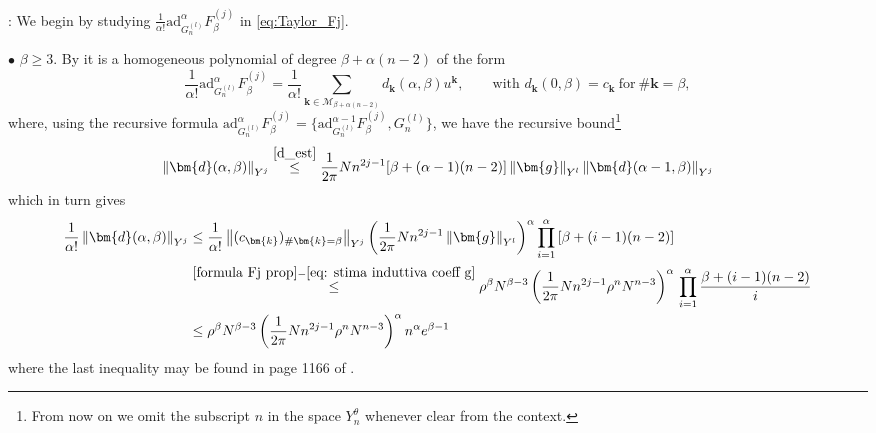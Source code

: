 \documentclass[a4paper,10pt,reqno]{article}
\theoremstyle{definition}
\theoremstyle{plain}
\theoremstyle{plain}
\theoremstyle{definition}
\theoremstyle{plain}
\theoremstyle{plain}
\theoremstyle{plain}
\theoremstyle{definition}
\theoremstyle{definition}
\newcommand{\norm}[1]{\left\lVert #1 \right\rVert}
\def \k{\bm{k}}
\begin{document}
\medskip

: We begin by studying $\frac{1}{\alpha !} \mathrm{ad}_{G_n^{(l)}}^{\alpha} F_{\beta}^{(j)}$ in \eqref{eq:Taylor_Fj}.

\medskip

\noindent $\bullet$ $\beta \ge 3$. By  it is a homogeneous polynomial of degree $\beta + \alpha(n-2)$ of the form
\begin{equation}\label{def: dk alpha beta}
\frac{1}{\alpha !} \mathrm{ad}_{G_n^{(l)}}^{\alpha} F_{\beta}^{(j)} = \frac{1}{\alpha !} \sum_{\k \in \mathcal{M}_{\beta + \alpha(n-2)}} d_{\k}(\alpha,\beta) u^{\k}, \qquad \mathrm{with} \, \,  d_{\k} (0,\beta)=c_{\k}\ \mathrm{for}\ \#\k=\beta,
\end{equation}
where, using the recursive formula $\mathrm{ad}_{G_n^{(l)}}^{\alpha} F_{\beta}^{(j)} = \{ \mathrm{ad}_{G_n^{(l)}}^{\alpha-1} F_{\beta}^{(j)} , G_n^{(l)} \}$, we have the recursive bound\footnote{From now on we omit the subscript $n$ in the space $Y^{\theta}_n$ whenever clear from the context.}
\[
\norm{\bm{d}(\alpha,\beta)}_{Y^j} \stackrel{\eqref{d_est}}{\le} \frac{1}{2\pi} N n^{2j-1} [ \beta + (\alpha-1)(n-2) ] \norm{\bm{g}}_{Y^l} \norm{\bm{d}(\alpha-1,\beta)}_{Y^j}
\]
which in turn gives
\begin{align}
\frac{1}{\alpha !} \norm{\bm{d}(\alpha,\beta)}_{Y^j} &\le \frac{1}{\alpha !} \norm{ ( c_{\k} )_{\#\k=\beta} }_{Y^j} \left ( \frac{1}{2\pi} N n^{2j-1} \norm{\bm{g}}_{Y^l}  \right )^{\alpha} \prod_{i=1}^{\alpha} \left [ \beta + (i-1)(n-2) \right] \nonumber\\
& \stackrel{\eqref{formula Fj prop}-\eqref{eq: stima induttiva coeff g}}{\le} \rho^{\beta} N^{\beta-3} \left ( \frac{1}{2\pi} N n^{2j-1} \rho^n N^{n-3} \right )^{\alpha}\,  \prod_{i=1}^{\alpha} \frac{\beta + (i-1)(n-2)}{i}\nonumber \\
& \le \rho^{\beta} N^{\beta-3} \left ( \frac{1}{2\pi} N n^{2j-1} \rho^n N^{n-3} \right )^{\alpha} n^{\alpha} e^{\beta-1} \nonumber
\end{align}
where the last inequality may be found in page 1166 of \cite{bernier}.
\end{document}
